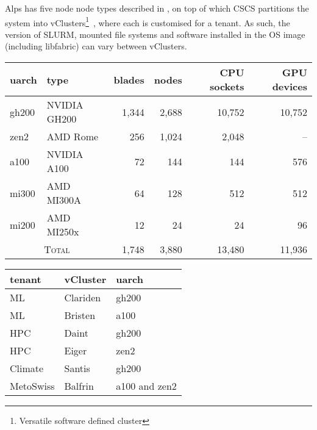 Alps has five node node types described in , on top of which CSCS partitions the system into vClusters\footnote{Versatile software defined cluster}~\cite{vClusters2023}, where each is customised for a tenant.
As such, the version of SLURM, mounted file systems and software installed in the OS image (including libfabric) can vary between vClusters.

\begin{table*}[!htb]
    \begin{minipage}{0.6\textwidth}
        \centering
        \begin{tabular}{llrrrr}
        \toprule
        uarch   & type         & blades & nodes & CPU sockets & GPU devices \\
        \midrule
        gh200   & NVIDIA GH200 & 1,344   & 2,688  & 10,752      & 10,752      \\
        zen2    & AMD Rome     & 256     & 1,024  & 2,048       & --          \\
        a100    & NVIDIA A100  & 72      & 144    & 144         & 576         \\
        mi300   & AMD MI300A   & 64      & 128    & 512         & 512         \\
        mi200   & AMD MI250x   & 12      & 24     & 24          & 96          \\
        \midrule
        \multicolumn{2}{c}{\textsc{Total}}      & 1,748   & 3,880  & 13,480  & 11,936 \\
        \bottomrule
        \end{tabular}
    \end{minipage}%
    \begin{minipage}{0.4\textwidth}
        \centering
        \begin{tabular}{lll}
        \toprule
        tenant   & vCluster & uarch         \\
        \midrule
            ML      & Clariden & gh200 \\
            ML      & Bristen  & a100 \\
            HPC     & Daint    & gh200 \\
            HPC     & Eiger    & zen2 \\
            Climate & Santis   & gh200  \\
            MetoSwiss & Balfrin   & a100 and zen2  \\
        \bottomrule
        \end{tabular}
    \end{minipage}
    \caption{Alps node types and their specifications (left), and examples of vClusters provided to tenants (right).}
\label{tab:alps-nodes}
\end{table*}

